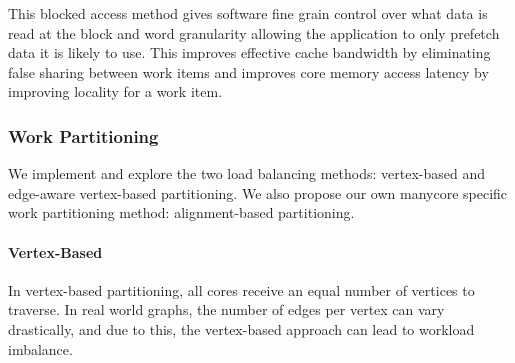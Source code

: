 This blocked access method gives software fine grain control over what data is read at the block and word granularity allowing the application to only prefetch data it is likely to use. 
This improves effective cache bandwidth by eliminating false sharing between work items and improves core memory access latency by improving locality for a work item.



\subsubsection{Work Partitioning} \label{sec:method:sub:edge-aware-partitioning}


We implement and explore the two load balancing methods: vertex-based and edge-aware vertex-based partitioning. We also propose our own manycore specific work partitioning method: alignment-based partitioning. 

\paragraph{Vertex-Based} In vertex-based partitioning, all cores receive an equal number of vertices to traverse. 
In real world graphs, the number of edges per vertex can vary drastically, and due to this, the vertex-based approach can lead to workload imbalance. 

